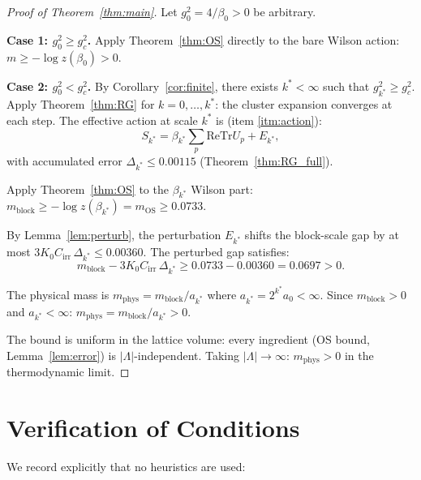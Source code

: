 \documentclass[11pt,a4paper]{amsart}
\theoremstyle{definition}
\newcommand{\re}{\mathrm{Re}}
\newcommand{\Tr}{\mathrm{Tr}}
\newcommand{\gB}{g^2_c}
\begin{document}
\begin{proof}[Proof of Theorem~\ref{thm:main}]
Let $g^2_0 = 4/\beta_0 > 0$ be arbitrary.

\textbf{Case 1: $g^2_0 \ge \gB$.}
Apply Theorem~\ref{thm:OS} directly to the bare Wilson action:
$m \ge -\log z(\beta_0) > 0$.

\textbf{Case 2: $g^2_0 < \gB$.}
By Corollary~\ref{cor:finite}, there exists $k^* < \infty$ such that
$g^2_{k^*}\ge\gB$.
Apply Theorem~\ref{thm:RG} for $k = 0,\ldots, k^*$:
the cluster expansion converges at each step.
The effective action at scale $k^*$ is (item \ref{itm:action}):
\[
  S_{k^*} = \beta_{k^*}\sum_p\re\Tr U_p + E_{k^*},
\]
with accumulated error $\Delta_{k^*} \le 0.00115$ (Theorem~\ref{thm:RG_full}).

Apply Theorem~\ref{thm:OS} to the $\beta_{k^*}$ Wilson part:
$m_{\mathrm{block}} \ge -\log z(\beta_{k^*}) = m_{\mathrm{OS}} \ge 0.0733$.

By Lemma~\ref{lem:perturb}, the perturbation $E_{k^*}$ shifts the
block-scale gap by at most $3K_0 C_{\mathrm{irr}}\,\Delta_{k^*} \le 0.00360$.
The perturbed gap satisfies:
\[
  m_{\mathrm{block}} - 3K_0 C_{\mathrm{irr}}\,\Delta_{k^*}
  \ge 0.0733 - 0.00360 = 0.0697 > 0.
\]

The physical mass is $m_{\mathrm{phys}} = m_{\mathrm{block}}/a_{k^*}$
where $a_{k^*} = 2^{k^*}a_0 < \infty$.
Since $m_{\mathrm{block}} > 0$ and $a_{k^*} < \infty$:
$m_{\mathrm{phys}} = m_{\mathrm{block}}/a_{k^*} > 0$.

The bound is uniform in the lattice volume: every ingredient
(OS bound, Lemma~\ref{lem:error}) is $|\Lambda|$-independent.
Taking $|\Lambda|\to\infty$: $m_{\mathrm{phys}} > 0$ in the thermodynamic limit.
\end{proof}

\section{Verification of Conditions}
\label{sec:verify}

We record explicitly that no heuristics are used:
\end{document}

